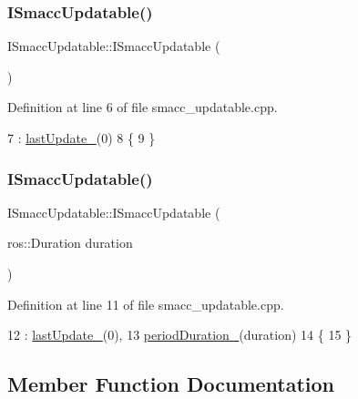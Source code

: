 \subsubsection{\texorpdfstring{I\+Smacc\+Updatable()}{ISmaccUpdatable()}\hspace{0.1cm}{\footnotesize\ttfamily [1/2]}}
{\footnotesize\ttfamily I\+Smacc\+Updatable\+::\+I\+Smacc\+Updatable (\begin{DoxyParamCaption}{ }\end{DoxyParamCaption})}



Definition at line 6 of file smacc\+\_\+updatable.\+cpp.


\begin{DoxyCode}
7     : \hyperlink{classsmacc_1_1ISmaccUpdatable_ad58f7e1cd26d3fe8c3a3fccecc57feac}{lastUpdate\_}(0)
8 \{
9 \}
\end{DoxyCode}
\mbox{\label{classsmacc_1_1ISmaccUpdatable_ab864845da3d2f84c23f26af1159a2cf2}} 
\subsubsection{\texorpdfstring{I\+Smacc\+Updatable()}{ISmaccUpdatable()}\hspace{0.1cm}{\footnotesize\ttfamily [2/2]}}
{\footnotesize\ttfamily I\+Smacc\+Updatable\+::\+I\+Smacc\+Updatable (\begin{DoxyParamCaption}\item[{ros\+::\+Duration}]{duration }\end{DoxyParamCaption})}



Definition at line 11 of file smacc\+\_\+updatable.\+cpp.


\begin{DoxyCode}
12     : \hyperlink{classsmacc_1_1ISmaccUpdatable_ad58f7e1cd26d3fe8c3a3fccecc57feac}{lastUpdate\_}(0),
13       \hyperlink{classsmacc_1_1ISmaccUpdatable_ad02d9798ac5609f3ecb9fb8a46febc18}{periodDuration\_}(duration)
14 \{
15 \}
\end{DoxyCode}


\subsection{Member Function Documentation}
\mbox{\label{classsmacc_1_1ISmaccUpdatable_af6edbb3896745920ed82fd807358fa47}} 
